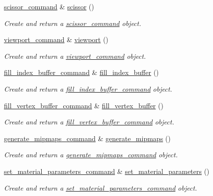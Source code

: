 \begin{DoxyCompactItemize}
\mbox{\hyperlink{classmoka_1_1scissor__command}{scissor\+\_\+command}} \& \mbox{\hyperlink{classmoka_1_1command__buffer_a5185177f4b1c9606192a66a5804d30b9}{scissor}} ()
\begin{DoxyCompactList}\small\item\em Create and return a \mbox{\hyperlink{classmoka_1_1scissor__command}{scissor\+\_\+command}} object. \end{DoxyCompactList}\item 
\mbox{\hyperlink{classmoka_1_1viewport__command}{viewport\+\_\+command}} \& \mbox{\hyperlink{classmoka_1_1command__buffer_a0c60e605038b5fe71beb200be502fb02}{viewport}} ()
\begin{DoxyCompactList}\small\item\em Create and return a \mbox{\hyperlink{classmoka_1_1viewport__command}{viewport\+\_\+command}} object. \end{DoxyCompactList}\item 
\mbox{\hyperlink{classmoka_1_1fill__index__buffer__command}{fill\+\_\+index\+\_\+buffer\+\_\+command}} \& \mbox{\hyperlink{classmoka_1_1command__buffer_a0fe7a69cf32991748f49ce3d9d962c8d}{fill\+\_\+index\+\_\+buffer}} ()
\begin{DoxyCompactList}\small\item\em Create and return a \mbox{\hyperlink{classmoka_1_1fill__index__buffer__command}{fill\+\_\+index\+\_\+buffer\+\_\+command}} object. \end{DoxyCompactList}\item 
\mbox{\hyperlink{classmoka_1_1fill__vertex__buffer__command}{fill\+\_\+vertex\+\_\+buffer\+\_\+command}} \& \mbox{\hyperlink{classmoka_1_1command__buffer_ac392f93e0677fd637ea243d82c06c64d}{fill\+\_\+vertex\+\_\+buffer}} ()
\begin{DoxyCompactList}\small\item\em Create and return a \mbox{\hyperlink{classmoka_1_1fill__vertex__buffer__command}{fill\+\_\+vertex\+\_\+buffer\+\_\+command}} object. \end{DoxyCompactList}\item 
\mbox{\hyperlink{classmoka_1_1generate__mipmaps__command}{generate\+\_\+mipmaps\+\_\+command}} \& \mbox{\hyperlink{classmoka_1_1command__buffer_af16aae45ec53cf532bcc7c0bea412b80}{generate\+\_\+mipmaps}} ()
\begin{DoxyCompactList}\small\item\em Create and return a \mbox{\hyperlink{classmoka_1_1generate__mipmaps__command}{generate\+\_\+mipmaps\+\_\+command}} object. \end{DoxyCompactList}\item 
\mbox{\hyperlink{classmoka_1_1set__material__parameters__command}{set\+\_\+material\+\_\+parameters\+\_\+command}} \& \mbox{\hyperlink{classmoka_1_1command__buffer_a5f727a7e4ff787fa3f222f680228afd9}{set\+\_\+material\+\_\+parameters}} ()
\begin{DoxyCompactList}\small\item\em Create and return a \mbox{\hyperlink{classmoka_1_1set__material__parameters__command}{set\+\_\+material\+\_\+parameters\+\_\+command}} object. \end{DoxyCompactList}\end{DoxyCompactItemize}


